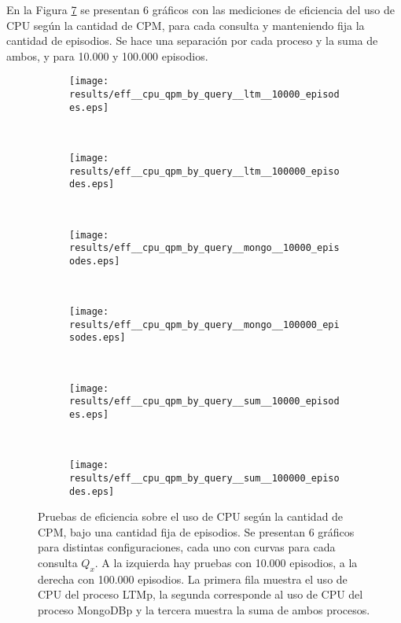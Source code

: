  En la Figura \ref{result:eff__cpu_qpm_by_query} se presentan 6 gráficos con las mediciones de eficiencia del uso de CPU según la cantidad de CPM, para cada consulta y manteniendo fija la cantidad de episodios. Se hace una separación por cada proceso y la suma de ambos, y para 10.000 y 100.000 episodios.

\begin{figure}[!ht]
	\centering
	\begin{subfigure}[b]{0.45\textwidth}
		\texttt{[image: results/eff\_\_cpu\_qpm\_by\_query\_\_ltm\_\_10000\_episodes.eps]}
		\caption{}
		\label{result:eff__cpu_qpm_by_query__ltm__10k_episodes}
	\end{subfigure}
	~
	\begin{subfigure}[b]{0.45\textwidth}
		\texttt{[image: results/eff\_\_cpu\_qpm\_by\_query\_\_ltm\_\_100000\_episodes.eps]}
		\caption{}
		\label{result:eff__cpu_qpm_by_query__ltm__100k_episodes}
	\end{subfigure}
	~
	\begin{subfigure}[b]{0.45\textwidth}
		\texttt{[image: results/eff\_\_cpu\_qpm\_by\_query\_\_mongo\_\_10000\_episodes.eps]}
		\caption{}
		\label{result:eff__cpu_qpm_by_query__mongo__10k_episodes}
	\end{subfigure}
	~
	\begin{subfigure}[b]{0.45\textwidth}
		\texttt{[image: results/eff\_\_cpu\_qpm\_by\_query\_\_mongo\_\_100000\_episodes.eps]}
		\caption{}
		\label{result:eff__cpu_qpm_by_query__mongo__100k_episodes}
	\end{subfigure}
	~
	\begin{subfigure}[b]{0.45\textwidth}
		\texttt{[image: results/eff\_\_cpu\_qpm\_by\_query\_\_sum\_\_10000\_episodes.eps]}
		\caption{}
		\label{result:eff__cpu_qpm_by_query__sum__10k_episodes}
	\end{subfigure}
	~
	\begin{subfigure}[b]{0.45\textwidth}
		\texttt{[image: results/eff\_\_cpu\_qpm\_by\_query\_\_sum\_\_100000\_episodes.eps]}
		\caption{}
		\label{result:eff__cpu_qpm_by_query__sum__100k_episodes}
	\end{subfigure}
	\caption[Eficiencia: Uso de CPU según CPM bajo cantidad fija de episodios.]
	{\small Pruebas de eficiencia sobre el uso de CPU según la cantidad de CPM, bajo una cantidad fija de episodios. Se presentan 6 gráficos para distintas configuraciones, cada uno con curvas para cada consulta $Q_x$. A la izquierda hay pruebas con 10.000 episodios, a la derecha con 100.000 episodios. La primera fila muestra el uso de CPU del proceso LTMp, la segunda corresponde al uso de CPU del proceso MongoDBp y la tercera muestra la suma de ambos procesos.}
	\label{result:eff__cpu_qpm_by_query}
\end{figure}


